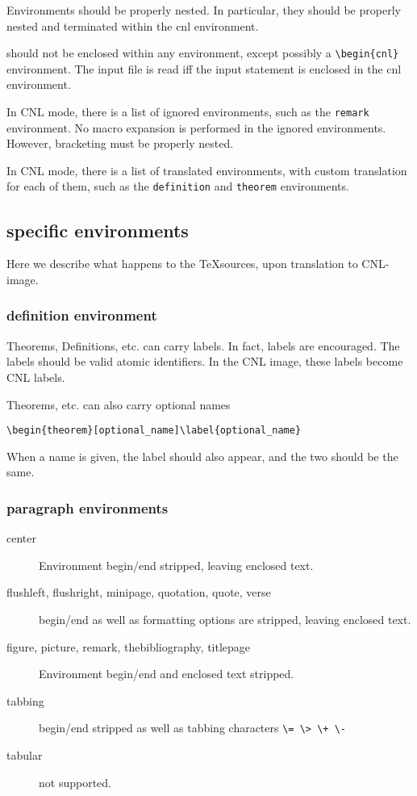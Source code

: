 \documentclass[12pt]{amsart}
\newtheorem{theorem}[definition]{Theorem}
\begin{document}
Environments should be properly nested.  In particular, they should be properly
nested and terminated within the cnl environment.

\verb!! should not be enclosed within any environment, except possibly a \verb!\begin{cnl}! environment.
The input file is read iff the input statement is enclosed in the cnl environment.

In CNL mode, there is a list of ignored environments, such as the
\verb!remark! environment.  No macro expansion is performed in
the ignored environments.  However, bracketing must be properly nested.


In CNL mode, there is a list of translated environments, with custom
translation for each of them, such as the \verb!definition!  and
\verb!theorem! environments.


\subsection{specific environments}

Here we describe what happens to the \TeX sources, 
upon translation to CNL-image.


\subsubsection{definition environment}

Theorems, Definitions, etc. can carry labels.  In fact, labels are
encouraged.  The labels should be valid atomic identifiers.  In the
CNL image, these labels become CNL labels.

Theorems, etc. can also carry optional names

\verb!\begin{theorem}[optional_name]\label{optional_name}!

When a name is given, the label should also appear, and the two should
be the same.


\subsubsection{paragraph environments}

\begin{description}
\item [center] Environment begin/end stripped, leaving enclosed text.
\item [flushleft, flushright, minipage, quotation, quote, verse]  begin/end as well as formatting options are stripped, leaving enclosed text.
\item [figure, picture, remark, thebibliography, titlepage] Environment begin/end and enclosed text stripped.
\item [tabbing]  begin/end stripped as well as tabbing characters \verb!\= \> \+ \-!
\item [tabular] not supported.
\end{description}
\end{document}
